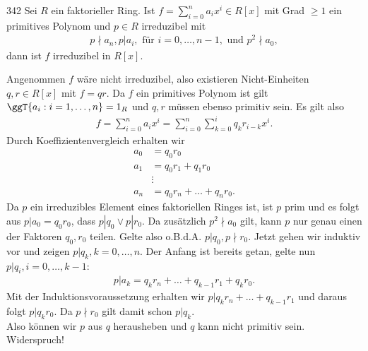 \begin{algebraUE}{342}
Sei $R$ ein faktorieller Ring. Ist $f = \sum_{i=0}^na_ix^i \in R[x]$ mit Grad $\geq 1$
ein primitives Polynom und $p \in R$ irreduzibel mit
\begin{align*}
  p \nmid a_n, p | a_i, \text{ für } i = 0,\dots,n-1, \text{ und } p^2 \nmid a_0,
\end{align*}
dann ist $f$ irreduzibel in $R[x]$.
\end{algebraUE}

\begin{solution}
Angenommen $f$ wäre nicht irreduzibel, also existieren Nicht-Einheiten $q,r \in R[x]$ mit $f = qr$.
Da $f$ ein primitives Polynom ist gilt $\ggT\{a_i: i = 1,\dots,n\} = 1_R$ und $q,r$
müssen ebenso primitiv sein. Es gilt also
\begin{align*}
  f = \sum_{i=0}^na_ix^i = \sum_{i = 0}^n \sum_{k= 0}^i q_kr_{i-k}x^i.
\end{align*}
Durch Koeffizientenvergleich erhalten wir
\begin{align*}
  a_0 &= q_0r_0 \\
  a_1 &= q_0r_1 + q_1r_0 \\
  &\vdots \\
  a_n &= q_0r_n + \dots + q_nr_0.
\end{align*}
Da $p$ ein irreduzibles Element eines faktoriellen Ringes ist, ist $p$ prim und es folgt
aus $p| a_0 = q_0r_0$, dass $p|q_0 \lor p|r_0$. Da zusätzlich $p^2 \nmid a_0$ gilt,
kann $p$ nur genau einen der Faktoren $q_0,r_0$ teilen. Gelte also o.B.d.A. $p | q_0, p \nmid r_0$.
Jetzt gehen wir induktiv vor und zeigen $p | q_k, k = 0,\dots,n$. Der Anfang ist bereits getan,
gelte nun $p | q_{i}, i = 0,\dots,k-1$:
\begin{align*}
  p | a_k = q_kr_n + \dots + q_{k-1}r_1 + q_kr_0.
\end{align*}
Mit der Induktionsvoraussetzung erhalten wir $p | q_kr_n + \dots + q_{k-1}r_1$
und daraus folgt $p | q_kr_0$. Da $p \nmid r_0$ gilt damit schon $p | q_k$. \\
Also können wir $p$ aus $q$ herausheben und $q$ kann nicht primitiv sein. Widerspruch!
\end{solution}
